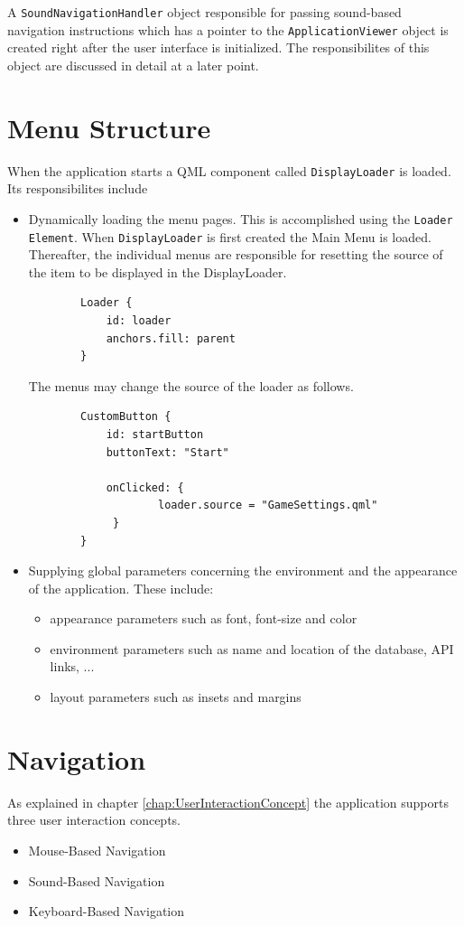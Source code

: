 A {\tt SoundNavigationHandler} object responsible for passing sound-based navigation instructions which has a pointer to the {\tt ApplicationViewer} object is created right after the user interface is initialized. The responsibilites of this object are discussed in detail at a later point.

\section {Menu Structure}
When the application starts a QML component called {\tt DisplayLoader} is loaded. 
Its responsibilites include 
\begin {itemize}
	\item {Dynamically loading the menu pages. This is accomplished using the {\tt Loader Element}. When {\tt DisplayLoader} is first created the Main Menu is loaded. Thereafter, the individual menus are responsible for resetting the source of the item to be displayed in the DisplayLoader.
	\begin{lstlisting}
		Loader {
			id: loader
			anchors.fill: parent
		}
	\end{lstlisting}
	The menus may change the source of the loader as follows.
	\begin{lstlisting}
		CustomButton {
			id: startButton
			buttonText: "Start"
				
			onClicked: {
			     	loader.source = "GameSettings.qml"
			 }
		}
	\end{lstlisting}
	}
	\item {
	Supplying global parameters concerning the environment and the appearance of the application. These include:
	\begin {itemize}
		\item{appearance parameters such as font, font-size and color}
		\item{environment parameters such as name and location of the database, API links, ...}
		\item{layout parameters such as insets and margins}
	\end {itemize}
	}
\end {itemize}
\section{Navigation}
As explained in chapter \ref{chap:UserInteractionConcept} the application supports three user interaction concepts.
\begin{itemize}
	\item {Mouse-Based Navigation}
	\item {Sound-Based Navigation}
	\item {Keyboard-Based Navigation}
\end{itemize}

